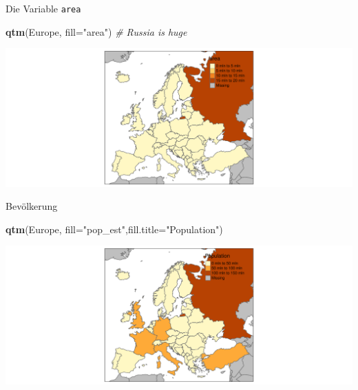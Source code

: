 \documentclass[ignorenonframetext,]{beamer}
\newenvironment{Shaded}{\begin{snugshade}}{\end{snugshade}}
\newcommand{\KeywordTok}[1]{\textcolor[rgb]{0.13,0.29,0.53}{\textbf{#1}}}
\newcommand{\DataTypeTok}[1]{\textcolor[rgb]{0.13,0.29,0.53}{#1}}
\newcommand{\StringTok}[1]{\textcolor[rgb]{0.31,0.60,0.02}{#1}}
\newcommand{\CommentTok}[1]{\textcolor[rgb]{0.56,0.35,0.01}{\textit{#1}}}
\newcommand{\NormalTok}[1]{#1}
\begin{document}
\begin{frame}[fragile]{Die Variable \texttt{area}}

\begin{Shaded}
\begin{Highlighting}[]
\KeywordTok{qtm}\NormalTok{(Europe, }\DataTypeTok{fill=}\StringTok{"area"}\NormalTok{) }\CommentTok{# Russia is huge}
\end{Highlighting}
\end{Shaded}

\includegraphics{slides_all2gether_part1_files/figure-beamer/unnamed-chunk-58-1.pdf}

\end{frame}

\begin{frame}[fragile]{Bevölkerung}

\begin{Shaded}
\begin{Highlighting}[]
\KeywordTok{qtm}\NormalTok{(Europe, }\DataTypeTok{fill=}\StringTok{"pop_est"}\NormalTok{,}\DataTypeTok{fill.title=}\StringTok{"Population"}\NormalTok{) }
\end{Highlighting}
\end{Shaded}

\includegraphics{slides_all2gether_part1_files/figure-beamer/unnamed-chunk-59-1.pdf}

\end{frame}
\end{document}
